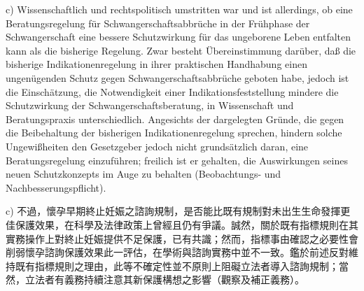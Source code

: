 \documentclass[12pt]{article}
\begin{document}
\begin{sourcepara}[title={原文D.82}]
c) Wissenschaftlich und rechtspolitisch umstritten war und ist allerdings, ob eine Beratungsregelung für Schwangerschaftsabbrüche in der Frühphase der Schwangerschaft eine bessere Schutzwirkung für das ungeborene Leben entfalten kann als die bisherige Regelung. Zwar besteht Übereinstimmung darüber, daß die bisherige Indikationenregelung in ihrer praktischen Handhabung einen ungenügenden Schutz gegen Schwangerschaftsabbrüche geboten habe, jedoch ist die Einschätzung, die Notwendigkeit einer Indikationsfeststellung mindere die Schutzwirkung der Schwangerschaftsberatung, in Wissenschaft und Beratungspraxis unterschiedlich. Angesichts der dargelegten Gründe, die gegen die Beibehaltung der bisherigen Indikationenregelung sprechen, hindern solche Ungewißheiten den Gesetzgeber jedoch nicht grundsätzlich daran, eine Beratungsregelung einzuführen; freilich ist er gehalten, die Auswirkungen seines neuen Schutzkonzepts im Auge zu behalten (Beobachtungs- und Nachbesserungspflicht).
\end{sourcepara}
\begin{transpara}
c) 不過，懷孕早期終止妊娠之諮詢規制，是否能比既有規制對未出生生命發揮更佳保護效果，在科學及法律政策上曾經且仍有爭議。誠然，關於既有指標規則在其實務操作上對終止妊娠提供不足保護，已有共識；然而，指標事由確認之必要性會削弱懷孕諮詢保護效果此一評估，在學術與諮詢實務中並不一致。鑑於前述反對維持既有指標規則之理由，此等不確定性並不原則上阻礙立法者導入諮詢規制；當然，立法者有義務持續注意其新保護構想之影響（觀察及補正義務）。
\end{transpara}

\end{document}
